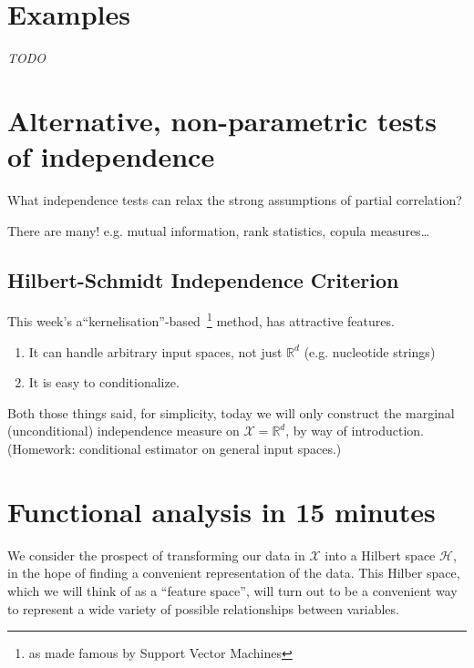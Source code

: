 \section{Examples}
\emph{TODO}
\clearpage
\section{Alternative, non-parametric tests of independence}
What independence tests can relax the strong assumptions of partial correlation?

There are many! e.g. mutual information, rank statistics, copula measures\ldots
\clearpage
\subsection{Hilbert-Schmidt Independence Criterion}
This week's a``kernelisation''-based~\footnote{as made famous by Support Vector Machines} method, has attractive features.
\begin{enumerate}
\item It can handle arbitrary input spaces, not just $\mathbb{R}^d$ (e.g. nucleotide strings)
\item It is easy to conditionalize.
\end{enumerate}
Both those things said, for simplicity, today we will only construct the marginal (unconditional) independence measure on $\mathcal{X}=\mathbb{R}^d$, by way of introduction. (Homework: conditional estimator on general input spaces.)
\clearpage
\section{Functional analysis in 15 minutes}
We consider the prospect of transforming our data in $\mathcal{X}$ into a Hilbert space $\mathcal{H}$, in the hope of finding a convenient representation of the data. This Hilber space, which we will think of as a ``feature space'', will turn out to be a convenient way to represent a wide variety of possible relationships between variables.


